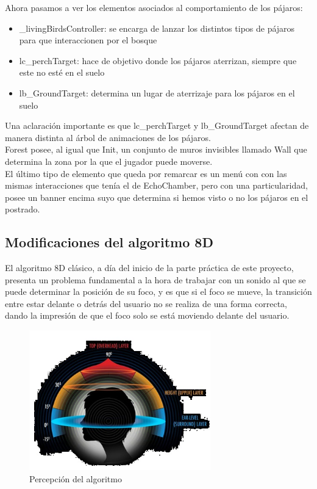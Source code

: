 \quad Ahora pasamos a ver los elementos asociados al comportamiento de los pájaros:

\begin{itemize}
	\item \_livingBirdsController: se encarga de lanzar los distintos tipos de pájaros para que interaccionen por el bosque
	\item lc\_perchTarget: hace de objetivo donde los pájaros aterrizan, siempre que este no esté en el suelo
	\item lb\_GroundTarget: determina un lugar de aterrizaje para los pájaros en el suelo
\end{itemize}

\quad Una aclaración importante es que lc\_perchTarget y lb\_GroundTarget afectan de manera distinta al árbol de animaciones de los pájaros.\\

\quad Forest posee, al igual que Init, un conjunto de muros invisibles llamado Wall que determina la zona por la que el jugador puede moverse.\\ 

\quad El último tipo de elemento que queda por remarcar es un menú con con las mismas interacciones que tenía el de EchoChamber, pero con una particularidad, posee un banner encima suyo que determina si hemos visto o no los pájaros en el postrado.\\


\subsection{Modificaciones del algoritmo 8D}

\quad El algoritmo 8D clásico, a día del inicio de la parte práctica de este proyecto, presenta un problema fundamental a la hora de trabajar con un sonido al que se puede determinar la posición de su foco, y es que si el foco se mueve, la transición entre estar delante o detrás del usuario no se realiza de una forma correcta, dando la impresión de que el foco solo se está moviendo delante del usuario.\\

\begin{figure}[htb]
	\centering
	\includegraphics[width=0.7\textwidth]{./imagenes/8D}
	\caption{Percepción del algoritmo}
\end{figure}
\FloatBarrier

